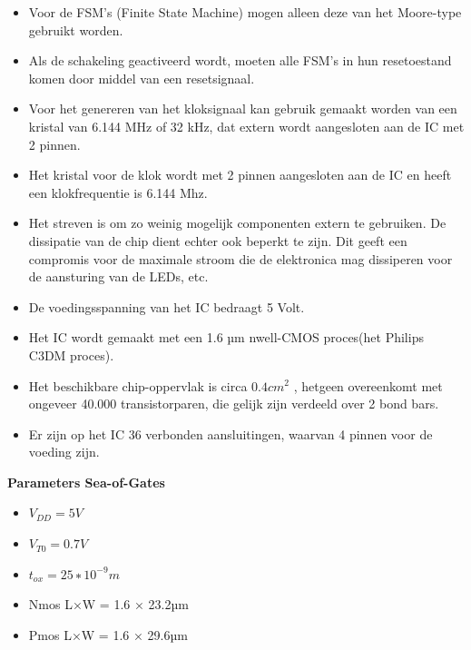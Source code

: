 \documentclass{scrartcl} %
\begin{document}
\begin {itemize}
\item  Voor de FSM’s (Finite State Machine) mogen alleen deze van het Moore-type gebruikt
worden.
\item Als de schakeling geactiveerd wordt, moeten alle FSM’s in hun resetoestand komen door middel van een resetsignaal.
\item Voor het genereren van het kloksignaal kan gebruik gemaakt worden van een kristal van 6.144 MHz of 32 kHz, dat extern wordt aangesloten aan de IC met 2 pinnen.
\item Het kristal voor de klok wordt met 2 pinnen aangesloten aan de IC en heeft een klokfrequentie is 6.144 Mhz.
\item Het streven is om zo weinig mogelijk componenten extern te gebruiken. De dissipatie van de chip dient echter ook beperkt te zijn. Dit geeft een compromis voor de maximale stroom
die de elektronica mag dissiperen voor de aansturing van de LEDs, etc.
\item De voedingsspanning van het IC bedraagt 5 Volt.
\item Het IC wordt gemaakt met een 1.6 µm nwell-CMOS proces(het Philips C3DM proces).
\item  Het beschikbare chip-oppervlak is circa $0.4  cm^2$ , hetgeen overeenkomt met ongeveer 40.000 transistorparen, die gelijk zijn verdeeld over 2 bond bars.
\item  Er zijn op het IC 36 verbonden aansluitingen, waarvan 4 pinnen voor de voeding zijn.
\end {itemize}

\textbf{Parameters Sea-of-Gates}
\begin {itemize}
\item $V_{DD} = 5V$
\item$ V_{T0} = 0.7V$
\item  $t_{ox} = 25 ∗ 10^{−9}m$
\item Nmos L×W = 1.6 × 23.2µm
\item Pmos L×W = 1.6 × 29.6µm
\end {itemize}
\end{document}

